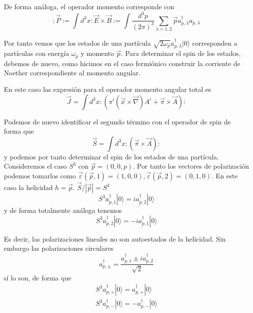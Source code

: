 De forma análoga, el operador momento corresponde con
\begin{equation*}
: \vec{P}:=\int d^{3} x: \vec{E} \times \vec{B}:=\int \frac{d^{3} p}{(2 \pi)^{3}} \sum_{\lambda=1,2} \vec{p} a_{p, \lambda}^{\dagger} a_{p, \lambda} \tag{6.37}
\end{equation*}

Por tanto vemos que los estados de una partícula $\sqrt{2 \omega_{p}} a_{p, \lambda}^{\dagger}|0\rangle$ corresponden a partículas con energía $\omega_{p}$ y momento $\vec{p}$. Para determinar el spin de los estados, debemos de nuevo, como hicimos en el caso fermiónico construir la corriente de Noether correspondiente al momento angular.

En este caso las expresión para el operador momento angular total es
\begin{equation*}
\vec{J}=\int d^{3} x:\left(\pi^{i}(\vec{x} \times \vec{\nabla}) A^{i}+\vec{\pi} \times \vec{A}\right): \tag{6.38}
\end{equation*}

Podemos de nuevo identificar el segundo término con el operador de spin de forma que
\begin{equation*}
\vec{S}=\int d^{3} x:(\vec{\pi} \times \vec{A}): \tag{6.39}
\end{equation*}
y podemos por tanto determinar el spin de los estados de una partícula.
Consideremos el caso $S^{3}$ con $\vec{p}=(0,0, p)$. Por tanto los vectores de polarización podemos tomarlos como $\vec{\varepsilon}(\vec{p}, 1)=(1,0,0), \vec{\varepsilon}(\vec{p}, 2)=(0,1,0)$. En este caso la helicidad $h=\vec{p}$. $\vec{S} /|\vec{p}|=S^{3}$
\begin{equation*}
S^{3} a_{p, 1}^{\dagger}|0\rangle=i a_{p, 2}^{\dagger}|0\rangle \tag{6.40}
\end{equation*}
y de forma totalmente análoga tenemos
\begin{equation*}
S^{3} a_{p, 2}^{\dagger}|0\rangle=-i a_{p, 1}^{\dagger}|0\rangle \tag{6.41}
\end{equation*}

Es decir, las polarizaciones lineales no son autoestados de la helicidad. Sin embargo las polarizaciones circulares
\begin{equation*}
a_{p, \pm}^{\dagger}=\frac{a_{p, 1}^{\dagger} \pm i a_{p, 2}^{\dagger}}{\sqrt{2}} \tag{6.42}
\end{equation*}
sí lo son, de forma que
$$
\begin{gather*}
S^{3} a_{p,+}^{\dagger}|0\rangle=a_{p,+}^{\dagger}|0\rangle \\
S^{3} a_{p,-}^{\dagger}|0\rangle=-a_{p,-}^{\dagger}|0\rangle \tag{6.43}
\end{gather*}
$$

